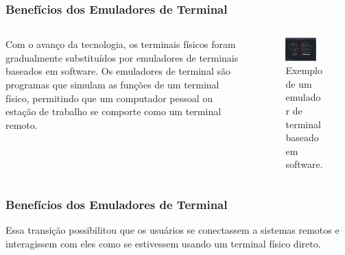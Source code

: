 \documentclass{beamer}
\begin{document}
            \begin{frame}\justifying
                \frametitle{Benefícios dos Emuladores de Terminal}
                
                
                \begin{columns}\justifying
                \begin{column}{0.6\textwidth}
                    Com o avanço da tecnologia, os terminais físicos foram gradualmente substituídos por emuladores de terminais baseados em software. Os emuladores de terminal são programas que simulam as funções de um terminal físico, permitindo que um computador pessoal ou estação de trabalho se comporte como um terminal remoto.
                \end{column}
                
                \begin{column}{0.4\textwidth}
                \begin{figure}
                    \centering
                    \includegraphics[width=0.8\textwidth]{assets/aula-tads-pfds/terminal_emulador.png}
                    \caption{Exemplo de um emulador de terminal baseado em software.}
                \end{figure}
                \end{column}
                \end{columns}
                \end{frame}

            \begin{frame}\justifying
                  \frametitle{Benefícios dos Emuladores de Terminal}
                  Essa transição possibilitou que os usuários se conectassem a sistemas remotos e interagissem com eles como se estivessem usando um terminal físico direto.
            \end{frame}
            
\end{document}
